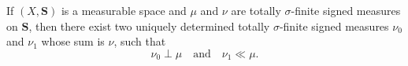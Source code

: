 If $(X, \mathbf{S})$ is a measurable space and $\mu$ and $\nu$ are totally $\sigma$-finite signed measures on $\mathbf{S}$, then there exist two uniquely determined totally $\sigma$-finite signed measures $\nu_0$ and $\nu_1$ whose sum is $\nu$, such that
$$\nu_0 \perp \mu \quad \text{and} \quad \nu_1 \ll \mu.$$
